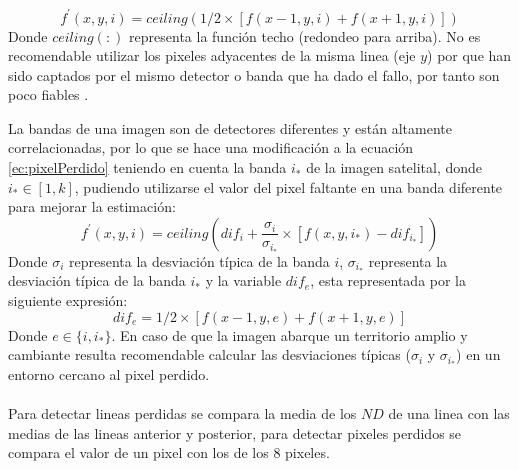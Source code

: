		\begin{equation}\label{ec:pixelPerdido}
		f^{'}(x,y,i) =  ceiling(1/2 \times [f(x-1,y,i) + f(x+1,y,i)])
		\end{equation} 
Donde $ ceiling(:) $ representa la funci\'on techo (redondeo para arriba). No es recomendable utilizar los pixeles adyacentes de la misma linea (eje $ y $) por que han sido captados por el mismo detector o banda que ha dado el fallo, por tanto son poco fiables \cite{cor2015radio}.

La bandas de una imagen son de detectores diferentes y est\'an altamente correlacionadas, por lo que se hace una modificaci\'on a la ecuaci\'on \ref{ec:pixelPerdido} teniendo en cuenta la banda $ i_{*} $ de la imagen satelital, donde $ i_{*} \in [1,k] $, pudiendo utilizarse el valor del pixel faltante en una banda diferente para mejorar la estimaci\'on:
		\begin{equation}
		f^{'}(x,y,i) = ceiling( dif_{i}+ \dfrac{\sigma_{i}}{\sigma_{i_{*}}} \times [f(x,y,i_{*})-dif_{i_{*}}])
		\end{equation} 
Donde $ \sigma_{i} $ representa la desviaci\'on t\'ipica de la banda $ i $, $ \sigma_{i_{*}} $ representa la desviaci\'on t\'ipica de la banda $ i_{*} $ y la variable $ dif_{e} $, esta representada por la siguiente expresi\'on:
		\begin{equation}
		 dif_{e}  = 1/2 \times [f(x-1,y,e) + f(x+1,y,e)]
		\end{equation} 
Donde $ e \in \{ i,i_{*}\} $. En caso de que la imagen abarque un territorio amplio y cambiante resulta recomendable calcular las desviaciones t\'ipicas ($ \sigma_{i} $ y $ \sigma_{i_{*}} $) en un entorno cercano al pixel perdido.\\~\\
Para detectar lineas perdidas se compara la media de los $ ND $ de una linea con las medias de las lineas anterior y posterior, para detectar pixeles perdidos se compara el valor de un pixel con los de los 8 pixeles.
